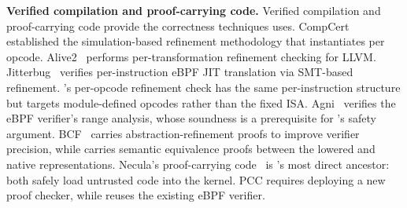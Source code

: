 \noindent\textbf{Verified compilation and proof-carrying code.}
Verified compilation and proof-carrying code provide the correctness techniques \lang uses. CompCert~\cite{leroy2009formal} established the simulation-based refinement methodology that \lang instantiates per opcode. Alive2~\cite{lopes2021alive2} performs per-transformation refinement checking for LLVM. Jitterbug~\cite{nelson2020specification} verifies per-instruction eBPF JIT translation via SMT-based refinement. \lang's per-opcode refinement check has the same per-instruction structure but targets module-defined opcodes rather than the fixed ISA. Agni~\cite{vishwanathan2023verifying} verifies the eBPF verifier's range analysis, whose soundness is a prerequisite for \lang's safety argument. BCF~\cite{sun2025prove} carries abstraction-refinement proofs to improve verifier precision, while \lang carries semantic equivalence proofs between the lowered and native representations. Necula's proof-carrying code~\cite{necula1997pcc} is \lang's most direct ancestor: both safely load untrusted code into the kernel. PCC requires deploying a new proof checker, while \lang reuses the existing eBPF verifier.